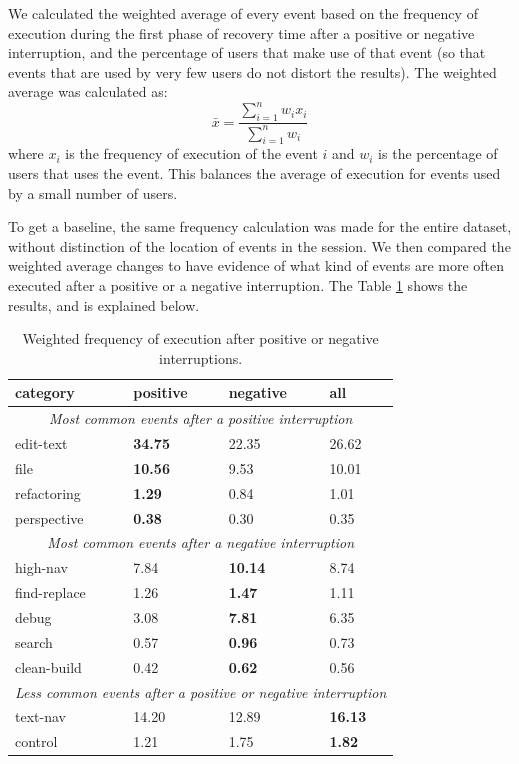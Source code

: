 \documentclass[times]{smrauth}
\begin{document}
We calculated the weighted average of every event based on the frequency of execution during the first phase of recovery time after a positive or negative interruption, and the percentage of users that make use of that event (so that events that are used by very few users do not distort the results). The weighted average was calculated as: $$\bar{x} = \frac{\sum_{i=1}^{n}w_ix_i}{\sum_{i=1}^{n}w_i} $$where $x_i$ is the frequency of execution of the event $i$ and $w_i$ is the percentage of users that uses the event. This balances the average of execution for events used by a small number of users. 

To get a baseline, the same frequency calculation was made for the entire dataset, without distinction of the location of events in the session. We then compared the weighted average changes to have evidence of what kind of events are more often executed after a positive or a negative interruption. The Table \ref{tbl:stats_events} shows the results, and is explained below.

\begin{table}[ht!]
\small
\renewcommand{\arraystretch}{1.3}
\caption{Weighted frequency of execution after positive or negative interruptions. }
\label{tbl:stats_events}
\centering
\begin{tabular}{|p{3cm}|p{2cm} |p{2cm}|p{2cm}|} 
  \hline 
category & positive & negative & all \\  
  \hline 
\multicolumn{4}{c}{\textit{Most common events after a positive interruption}} \\
    \hline 
edit-text &  \textbf{34.75} & 22.35 & 26.62 \\
file &  \textbf{10.56} & 9.53 & 10.01\\
refactoring & \textbf{1.29} & 0.84 & 1.01 \\
perspective & \textbf{0.38} & 0.30 & 0.35  \\
    \hline 
\multicolumn{4}{c}{\textit{Most common events after a negative interruption}} \\
    \hline 
high-nav & 7.84 & \textbf{10.14} & 8.74  \\
find-replace & 1.26 & \textbf{1.47} & 1.11 \\
debug & 3.08 & \textbf{7.81} & 6.35  \\
search & 0.57 & \textbf{0.96} & 0.73 \\
clean-build & 0.42 & \textbf{0.62} & 0.56  \\
    \hline 
\multicolumn{4}{c}{\textit{Less common events after a positive or negative interruption}} \\
    \hline 
text-nav & 14.20 & 12.89 & \textbf{16.13} \\
control & 1.21 & 1.75 & \textbf{1.82} \\
\hline
\end{tabular}
\end{table}
\end{document}
